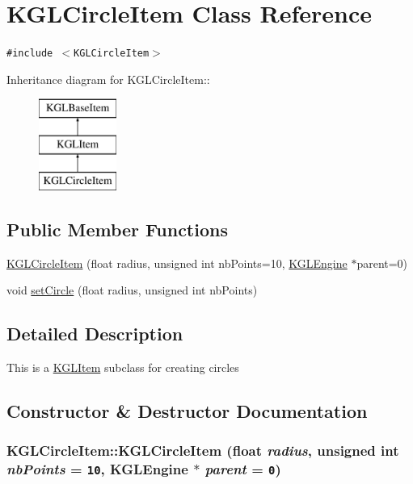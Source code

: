 \hypertarget{class_k_g_l_circle_item}{
\section{KGLCircleItem Class Reference}
\label{class_k_g_l_circle_item}
}
{\tt \#include $<$KGLCircleItem$>$}

Inheritance diagram for KGLCircleItem::\begin{figure}[H]
\begin{center}
\leavevmode
\includegraphics[height=3cm]{class_k_g_l_circle_item}
\end{center}
\end{figure}
\subsection*{Public Member Functions}
\begin{CompactItemize}
\item 
\hyperlink{class_k_g_l_circle_item_20c2a9aa6bfc35947dba70b84c0746b5}{KGLCircleItem} (float radius, unsigned int nbPoints=10, \hyperlink{class_k_g_l_engine}{KGLEngine} $\ast$parent=0)
\item 
void \hyperlink{class_k_g_l_circle_item_0a0419138f452f5d0e65fb28c77bda96}{setCircle} (float radius, unsigned int nbPoints)
\end{CompactItemize}


\subsection{Detailed Description}
This is a \hyperlink{class_k_g_l_item}{KGLItem} subclass for creating circles 

\subsection{Constructor \& Destructor Documentation}
\hypertarget{class_k_g_l_circle_item_20c2a9aa6bfc35947dba70b84c0746b5}{
\subsubsection[{KGLCircleItem}]{\setlength{\rightskip}{0pt plus 5cm}KGLCircleItem::KGLCircleItem (float {\em radius}, \/  unsigned int {\em nbPoints} = {\tt 10}, \/  {\bf KGLEngine} $\ast$ {\em parent} = {\tt 0})}}
\label{class_k_g_l_circle_item_20c2a9aa6bfc35947dba70b84c0746b5}




